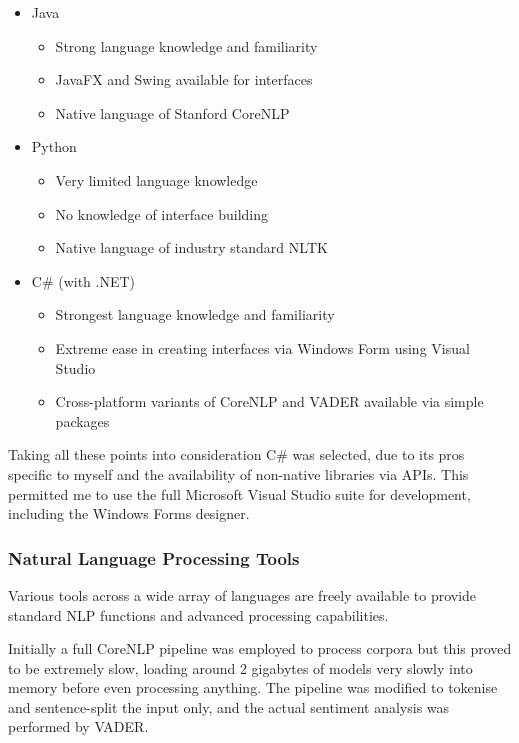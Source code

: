 \documentclass[a4paper]{article}
\begin{document}
        \begin{itemize}
            \item Java
            \begin{itemize}
                \item Strong language knowledge and familiarity
                \item JavaFX and Swing available for interfaces
                \item Native language of Stanford CoreNLP
            \end{itemize}
            \item Python
            \begin{itemize}
                \item Very limited language knowledge
                \item No knowledge of interface building
                \item Native language of industry standard NLTK
            \end{itemize}
            \item C\# (with .NET)
            \begin{itemize}
                \item Strongest language knowledge and familiarity
                \item Extreme ease in creating interfaces via Windows Form using Visual Studio
                \item Cross-platform variants of CoreNLP and VADER available via simple packages
            \end{itemize}
        \end{itemize}
        Taking all these points into consideration C\# was selected, due to its pros specific to myself and the availability of non-native libraries via APIs. This permitted me to use the full Microsoft Visual Studio suite for development, including the Windows Forms designer.
        \subsubsection{Natural Language Processing Tools}
        Various tools across a wide array of languages are freely available to provide standard NLP functions and advanced processing capabilities.

        Initially a full CoreNLP pipeline was employed to process corpora but this proved to be extremely slow, loading around 2 gigabytes of models very slowly into memory before even processing anything. The pipeline was modified to tokenise and sentence-split the input only, and the actual sentiment analysis was performed by VADER.
\end{document}
